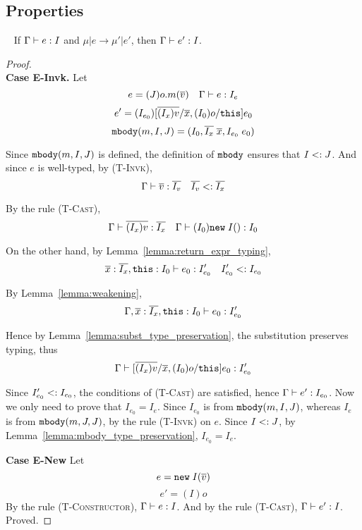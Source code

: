 \subsection{Properties}




\begin{theorem}~\label{theorem_subject}
If $\Gamma \; {\vdash} \; e : I$ and $\mu | e \rightarrow \mu' | e'$, 
then $\Gamma \; {\vdash} \; e' : I$.
\end{theorem}
\begin{proof} ~\\
\indent \textbf{Case E-Invk.} Let
  $$e = (J)o.m(\overline{v}) \quad \Gamma \; {\vdash} \; e : I_e$$
  $$e' = (I_{e_0})[\overline{(I_x)v}/\overline{x}, (I_0)o/\texttt{this}]e_0$$
  $$\texttt{mbody}(m, I, J) = (I_0, \overline{I_x} \; \overline{x}, I_{e_0} \; e_0)$$

Since $\texttt{mbody}(m, I, J)$ is defined, the definition of $\texttt{mbody}$ ensures that $I <: J$. And since $e$ is well-typed, by \textsc{(T-Invk)},
  $$\Gamma \; {\vdash} \; \overline{v} : \overline{I_v} \quad \overline{I_v} <: \overline{I_x}$$

By the rule \textsc{(T-Cast)},
  $$\Gamma \; {\vdash} \; \overline{(I_x)v} : \overline{I_x} \quad \Gamma \; {\vdash} \; (I_0)\texttt{new} \; I() : I_0$$
  
On the other hand, by Lemma~\ref{lemma:return_expr_typing},
  $$\overline{x} : \overline{I_x}, \texttt{this}: I_0 \; {\vdash} \; e_0 : I'_{e_0} \quad I'_{e_0} <: I_{e_0}$$
  
By Lemma~\ref{lemma:weakening},
  $$\Gamma, \overline{x} : \overline{I_x}, \texttt{this}: I_0 \; {\vdash} \; e_0 : I'_{e_0}$$

Hence by Lemma~\ref{lemma:subst_type_preservation}, the substitution preserves typing, thus
  $$\Gamma \; {\vdash} \; [\overline{(I_x)v}/\overline{x}, (I_0)o/\texttt{this}]e_0 : I'_{e_0}$$
  
Since $I'_{e_0} <: I_{e_0}$, the conditions of \textsc{(T-Cast)} are satisfied, hence $\Gamma \; {\vdash} \; e' : I_{e_0}$. Now we only need to prove that $I_{e_0} = I_e$. Since $I_{e_0}$ is from $\texttt{mbody}(m, I, J)$, whereas $I_e$ is from $\texttt{mbody}(m, J, J)$, by the rule \textsc{(T-Invk)} on $e$. Since $I <: J$, by Lemma~\ref{lemma:mbody_type_preservation}, $I_{e_0} = I_e$.

\indent \textbf{Case E-New} Let   
$$e = \texttt{new} \; I(\overline{v})$$   
$$e' = (I)o$$   
By the rule \textsc{(T-Constructor)}, $\Gamma \; {\vdash} \; e:I$. And by the rule \textsc{(T-Cast)}, $\Gamma \; {\vdash} \; e':I$. Proved.


\end{proof}
